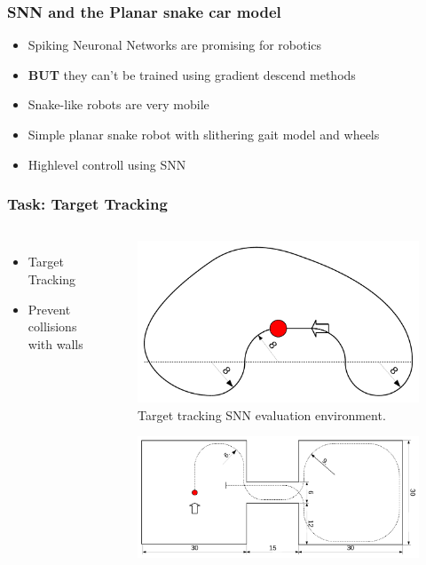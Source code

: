 
\begin{frame}
	\frametitle{SNN and the Planar snake car model}
	\begin{itemize}
		\item Spiking Neuronal Networks are promising for robotics
		\item \textbf{BUT} they can't be trained using gradient descend methods
		\item Snake-like robots are very mobile
		\item Simple planar snake robot with slithering gait model and wheels
		\item Highlevel controll using SNN
	\end{itemize}
\end{frame}

\begin{frame}
	\frametitle{Task: Target Tracking}
	\begin{columns}
			\begin{itemize}
				\item <1-> Target Tracking
				\item <2-> Prevent collisions with walls
			\end{itemize}
			\begin{overprint}
				\begin{figure}
					\centering
					\includegraphics[width=\textwidth]{img/eval_path_tf.pdf}
					\caption{Target tracking SNN evaluation environment.}
					\label{fig:eval_path_tf}
				\end{figure}
				\begin{figure}
					\centering
					\includegraphics[width=\textwidth]{img/eval_path.pdf}

\end{figure}
\end{overprint}
\end{columns}
\end{frame}
